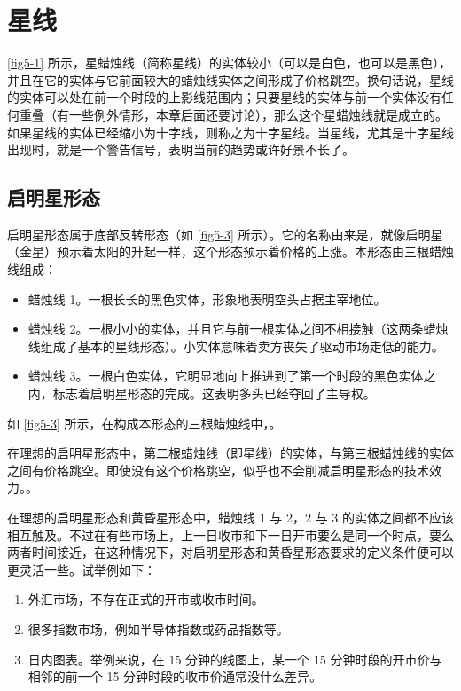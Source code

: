 \chapter{星线}
\autoref{fig5-1} 所示，星蜡烛线（简称星线）的实体较小（可以是白色，也可以是黑色），并且在它的实体与它前面较大的蜡烛线实体之间形成了价格跳空。换句话说，星线的实体可以处在前一个时段的上影线范围内；只要星线的实体与前一个实体没有任何重叠（有一些例外情形，本章后面还要讨论），那么这个星蜡烛线就是成立的。如果星线的实体已经缩小为十字线，则称之为十字星线。当星线，尤其是十字星线出现时，就是一个警告信号，表明当前的趋势或许好景不长了。

\section{启明星形态}
启明星形态属于底部反转形态（如 \autoref{fig5-3} 所示）。它的名称由来是，就像启明星（金星）预示着太阳的升起一样，这个形态预示着价格的上涨。本形态由三根蜡烛线组成：
\begin{itemize}
    \item 蜡烛线 1。一根长长的黑色实体，形象地表明空头占据主宰地位。
    \item 蜡烛线 2。一根小小的实体，并且它与前一根实体之间不相接触（这两条蜡烛线组成了基本的星线形态）。小实体意味着卖方丧失了驱动市场走低的能力。
    \item 蜡烛线 3。一根白色实体，它明显地向上推进到了第一个时段的黑色实体之内，标志着启明星形态的完成。这表明多头已经夺回了主导权。
\end{itemize}


如 \autoref{fig5-3} 所示，在构成本形态的三根蜡烛线中，。

在理想的启明星形态中，第二根蜡烛线（即星线）的实体，与第三根蜡烛线的实体之间有价格跳空。即使没有这个价格跳空，似乎也不会削减启明星形态的技术效力。。

在理想的启明星形态和黄昏星形态中，蜡烛线 1 与 2，2 与 3 的实体之间都不应该相互触及。不过在有些市场上，上一日收市和下一日开市要么是同一个时点，要么两者时间接近，在这种情况下，对启明星形态和黄昏星形态要求的定义条件便可以更灵活一些。试举例如下：
\begin{enumerate}
    \item 外汇市场，不存在正式的开市或收市时间。
    \item 很多指数市场，例如半导体指数或药品指数等。
    \item 日内图表。举例来说，在 15 分钟的线图上，某一个 15 分钟时段的开市价与相邻的前一个 15 分钟时段的收市价通常没什么差异。
\end{enumerate}